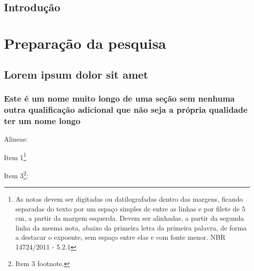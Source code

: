 \documentclass[12pt,openright,twoside,a4paper]{abntex2}
\begin{document}
\chapter*{Introdução}


\lipsum[1-2]

\part{Preparação da pesquisa}

\chapter{Lorem ipsum dolor sit amet}


\section{Este é um nome muito longo de uma seção sem nenhuma outra qualificação
adicional que não seja a própria qualidade ter um nome longo}

\lipsum[3]

Alineas:

\begin{alineas}
  \item Item 1\footnote{As notas devem ser digitadas ou datilografadas
  dentro das margens, ficando separadas do texto por um espaço simples de entre as
  linhas e por filete de 5 cm, a partir da margem esquerda. Devem ser
  alinhadas, a partir da segunda linha da mesma nota, abaixo da primeira letra
  da primeira palavra, de forma a destacar o expoente, sem espaço entre elas e
  com fonte menor. NBR 14724/2011 - 5.2.1}
  \item \lipsum[41]
  \item Item 3\footnote{Item 3 footnote.}:
  \begin{alineas}
    \item \lipsum[50]
    \item \lipsum[51]
  \end{alineas}
  \begin{incisos}
    \item \lipsum[52]
    \item \lipsum[53]
  \end{incisos}
  \item \lipsum[60]
\end{alineas}
\end{document}
